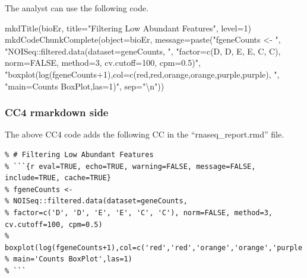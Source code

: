 \documentclass[
]{article}
\newenvironment{Shaded}{\begin{snugshade}}{\end{snugshade}}
\newcommand{\AttributeTok}[1]{\textcolor[rgb]{0.77,0.63,0.00}{#1}}
\newcommand{\DecValTok}[1]{\textcolor[rgb]{0.00,0.00,0.81}{#1}}
\newcommand{\FunctionTok}[1]{\textcolor[rgb]{0.00,0.00,0.00}{#1}}
\newcommand{\NormalTok}[1]{#1}
\newcommand{\SpecialCharTok}[1]{\textcolor[rgb]{0.00,0.00,0.00}{#1}}
\newcommand{\StringTok}[1]{\textcolor[rgb]{0.31,0.60,0.02}{#1}}
\begin{document}
The analyst can use the following code.

\begin{Shaded}
\begin{Highlighting}[]
\FunctionTok{mkdTitle}\NormalTok{(bioEr, }\AttributeTok{title=}\StringTok{"Filtering Low Abundant Features"}\NormalTok{, }\AttributeTok{level=}\DecValTok{1}\NormalTok{)}
\FunctionTok{mkdCodeChunkComplete}\NormalTok{(}\AttributeTok{object=}\NormalTok{bioEr, }\AttributeTok{message=}\FunctionTok{paste}\NormalTok{(}\StringTok{"fgeneCounts \textless{}{-} "}\NormalTok{,}
              \StringTok{"NOISeq::filtered.data(dataset=geneCounts, "}\NormalTok{,}
              \StringTok{"factor=c(\textquotesingle{}D\textquotesingle{}, \textquotesingle{}D\textquotesingle{}, \textquotesingle{}E\textquotesingle{}, \textquotesingle{}E\textquotesingle{}, \textquotesingle{}C\textquotesingle{}, \textquotesingle{}C\textquotesingle{}), norm=FALSE, method=3, cv.cutoff=100, cpm=0.5)"}\NormalTok{,}
              \StringTok{"boxplot(log(fgeneCounts+1),col=c(\textquotesingle{}red\textquotesingle{},\textquotesingle{}red\textquotesingle{},\textquotesingle{}orange\textquotesingle{},\textquotesingle{}orange\textquotesingle{},\textquotesingle{}purple\textquotesingle{},\textquotesingle{}purple\textquotesingle{}), "}\NormalTok{,}
              \StringTok{"main=\textquotesingle{}Counts BoxPlot\textquotesingle{},las=1)"}\NormalTok{, }\AttributeTok{sep=}\StringTok{"}\SpecialCharTok{\textbackslash{}n}\StringTok{"}\NormalTok{))}
\end{Highlighting}
\end{Shaded}

\hypertarget{cc4-rmarkdown-side}{%
\subsubsection{CC4 rmarkdown side}\label{cc4-rmarkdown-side}}

The above CC4 code adds the following CC in the ``rnaseq\_report.rmd''
file.

\begin{verbatim}
% # Filtering Low Abundant Features
% ```{r eval=TRUE, echo=TRUE, warning=FALSE, message=FALSE, include=TRUE, cache=TRUE}
% fgeneCounts <- 
% NOISeq::filtered.data(dataset=geneCounts, 
% factor=c('D', 'D', 'E', 'E', 'C', 'C'), norm=FALSE, method=3, cv.cutoff=100, cpm=0.5)
% boxplot(log(fgeneCounts+1),col=c('red','red','orange','orange','purple','purple'), 
% main='Counts BoxPlot',las=1)
% ```
\end{verbatim}
\end{document}
